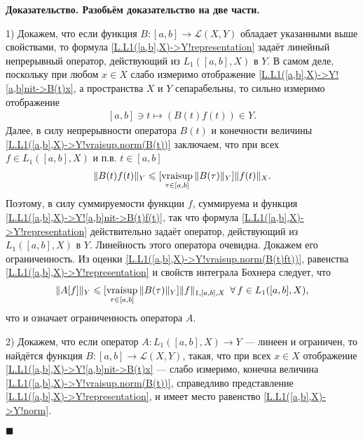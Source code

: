 \documentclass{report}
\newenvironment{Proof}{\par\noindent\bf Доказательство.\rm}{ $\blacksquare$\par}
\newcommand{\vraisup}{\mathop{\rm vraisup}}
\begin{document}
\begin{Proof}
Разобьём доказательство на две части.

1) Докажем, что если функция $B:[a,b]\to\mathcal{L}(X,Y)$ обладает указанными выше свойствами, то формула \eqref{L.L1([a,b],X)->Y!representation} задаёт линейный непрерывный оператор,
действующий из $L_1([a,b],X)$ в $Y$. В самом деле, поскольку при любом $x\in X$ слабо измеримо отображение \eqref{L.L1([a,b],X)->Y![a,b]nit->B(t)x}, а пространства $X$ и $Y$ сепарабельны, то
сильно измеримо отображение
\begin{gather}\label{L.L1([a,b],X)->Y![a,b]nit->B(t)f(t)}
[a,b]\ni t\mapsto (B(t)f(t))\in Y.
\end{gather}
Далее, в силу непрерывности оператора $B(t)$ и конечности величины \eqref{L.L1([a,b],X)->Y!vraisup.norm(B(t))} заключаем, что при всех $f\in L_1([a,b],X)$ и п.в. $t\in[a,b]$
\begin{gather}\label{L.L1([a,b],X)->Y!vraisup.norm(B(t)ft))}
\|B(t)f(t)\|_Y\leqslant[\vraisup\limits_{\tau\in[a,b]}\|B(\tau)\|_Y]\|f(t)\|_X.
\end{gather}
Поэтому, в силу суммируемости функции $f$, суммируема и функция \eqref{L.L1([a,b],X)->Y![a,b]nit->B(t)f(t)}, так что формула \eqref{L.L1([a,b],X)->Y!representation} действительно задаёт
оператор, действующий из $L_1([a,b],X)$ в $Y$. Линейность этого оператора очевидна. Докажем его ограниченность. Из оценки \eqref{L.L1([a,b],X)->Y!vraisup.norm(B(t)ft))}, равенства
\eqref{L.L1([a,b],X)->Y!representation} и свойств интеграла Бохнера следует, что
\begin{gather*}
\|A[f]\|_Y\leqslant[\vraisup\limits_{\tau\in[a,b]}\|B(\tau)\|_Y]\|f\|_{1,[a,b],X}\,\,\,\forall\,f\in L_1([a,b],X),
\end{gather*}
что и означает ограниченность оператора $A$.

2) Докажем, что если оператор $A:L_1([a,b],X)\to Y$ --- линеен и ограничен, то найдётся функция $B:[a,b]\to\mathcal{L}(X,Y)$, такая, что при всех $x\in X$ отображение
\eqref{L.L1([a,b],X)->Y![a,b]nit->B(t)x} --- слабо измеримо, конечна величина \eqref{L.L1([a,b],X)->Y!vraisup.norm(B(t))}, справедливо представление
\eqref{L.L1([a,b],X)->Y!representation}, и имеет место равенство \eqref{L.L1([a,b],X)->Y!norm}.


\end{Proof}
\end{document}
